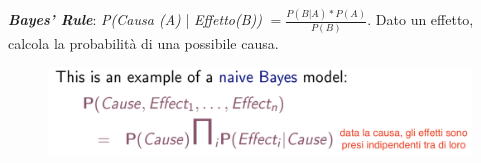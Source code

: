 \documentclass[a4paper, notitlepage, 9pt]{extreport}
\begin{document}
\begin{multicols}{2}
	\noindent
	\textit{\textbf{Bayes' Rule}}: \textit{P(Causa (A)} | \textit{Effetto(B))} $= \frac{P(B | A) * P(A)}{P(B)}$. Dato un effetto, calcola la probabilità di una possibile causa.
	\columnbreak
	\begin{figure}[H]
		\centering
		\includegraphics[scale=0.25]{Bayes}
	\end{figure}
\end{multicols}
\end{document}
